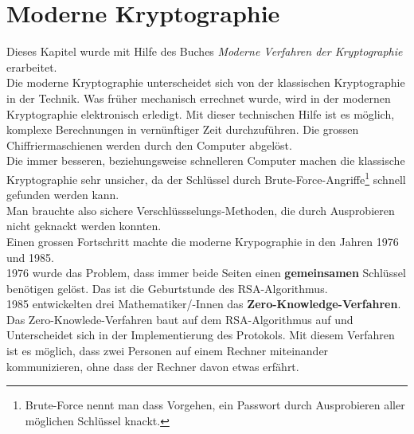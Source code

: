 \newpage
\section{Moderne Kryptographie}
Dieses Kapitel wurde mit Hilfe des Buches \textit{Moderne Verfahren der Kryptographie} erarbeitet.\\[2ex]
Die moderne Kryptographie unterscheidet sich von der klassischen Kryptographie in der Technik. Was früher mechanisch errechnet wurde, wird in der modernen Kryptographie elektronisch erledigt. Mit dieser technischen Hilfe ist es möglich, komplexe Berechnungen in vernünftiger Zeit durchzuführen. Die grossen Chiffriermaschienen werden durch den Computer abgelöst.\\
Die immer besseren, beziehungsweise schnelleren Computer machen die klassische Kryptographie sehr unsicher, da der Schlüssel durch Brute-Force-Angriffe\footnote{Brute-Force nennt man dass Vorgehen, ein Passwort durch Ausprobieren aller möglichen Schlüssel knackt.} schnell gefunden werden kann.\\
Man brauchte also sichere Verschlüssselungs-Methoden, die durch Ausprobieren nicht geknackt werden konnten.\\
Einen grossen Fortschritt machte die moderne Krypographie in den Jahren 1976 und 1985.\\
1976 wurde das Problem, dass immer beide Seiten einen \textbf{gemeinsamen} Schlüssel benötigen gelöst. Das ist die Geburtstunde des RSA-Algorithmus.\\
1985 entwickelten drei Mathematiker/-Innen das \textbf{Zero-Knowledge-Verfahren}. Das Zero-Knowlede-Verfahren baut auf dem RSA-Algorithmus auf und Unterscheidet sich in der Implementierung des Protokols. Mit diesem Verfahren ist es möglich, dass zwei Personen auf einem Rechner miteinander kommunizieren, ohne dass der Rechner davon etwas erfährt.
%
